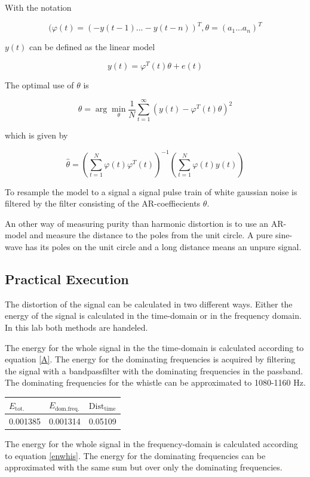 \documentclass[12pt]{article}
\begin{document}
With the notation

\[
(\varphi(t) =(-y(t-1) ... -y(t-n))^T,\theta = (a_1 ... a_n)^T 
\]

$y(t)$ can be defined as the linear model

\[
y(t)=\varphi^T(t)\theta+ e(t)
\]

The optimal use of $\theta$ is

\[
\hat{\theta}=\arg \min_{\theta} \frac{1}{N}\sum_{t=1}^{\infty}(y(t)-\varphi^T(t)\theta)^2
\]

which is given by

\[
\hat{\theta}=\left(\sum_{t=1}^N\varphi(t)\varphi^T(t)\right)^{-1}\left(\sum_{t=1}^N\varphi(t)y(t)\right)
\]

To resample the model to a signal a signal pulse train of white gaussian noise is filtered by the filter consisting of the AR-coeffiecients $\theta$.

An other way of measuring purity than harmonic distortion is to use an AR-model and measure the distance to the poles from the unit circle. A pure sine-wave has its poles on the unit circle and a long distance means an unpure signal.


\subsection{Practical Execution}
The distortion of the signal can be calculated in two different ways. Either the energy of the signal is calculated in the time-domain or in the frequency domain. In this lab both methods are handeled.

The energy for the whole signal in the the time-domain is calculated according to equation \ref{A}. The energy for the dominating frequencies is acquired by filtering the signal with a bandpassfilter with the dominating frequencies in the passband. The dominating frequencies for the whistle can be approximated to 1080-1160 Hz. 

\begin{center}
\begin{tabular}{l|l|l}
  \hline
  $E_{\mathrm{tot.}}$ &  $E_{\mathrm{dom. freq.}}$ & $\mathrm{Dist}_{\mathrm{time}}$ \\
  \hline
  0.001385 & 0.001314 & 0.05109
\end{tabular}
\end{center}

The energy for the whole signal in the frequency-domain is calculated according to equation \ref{enwhis}. The energy for the dominating frequencies can be approximated with the same sum but over only the dominating frequencies. 
\end{document}
